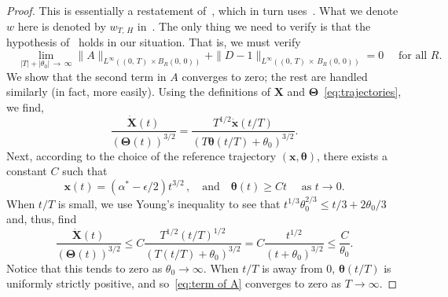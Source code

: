 \documentclass[10pt]{amsart}
\theoremstyle{definition}\newtheorem{defi}[theo]{Definition}\newtheorem{rema}[theo]{Remark}\newtheorem{exam}[theo]{Example}\newtheorem{exem}[theo]{Example}\newtheorem{nota}[theo]{Notation}
\newcommand{\bx}{\mathbf{x}}
\newcommand{\bX}{\mathbf{X}}
\newcommand{\btheta}{\boldsymbol{\theta}}
\newcommand{\bTheta}{\boldsymbol{\Theta}}
\newcommand{\1}{\mathds{1}}
\begin{document}
\begin{proof}
This is essentially a restatement of~\cite[p.~745]{BHR_acceleration}, which in turn uses~\cite[Lemmas~5.1, 5.2]{BHR_acceleration}. What we denote $w$ here is denoted by $w_{T,\,H}$ in~\cite{BHR_acceleration}. The only thing we need to verify is that the hypothesis of~\cite[Lemma~5.1]{BHR_acceleration} holds in our situation. That is, we must verify
\[
\quad \lim_{|T| + |\theta_0|\,\rightarrow\,\infty}\|A\|_{L^\infty\left((0,\,T)\,\times B_R(0,\,0)\right)}+\|D-1\|_{L^\infty\left((0,\,T)\,\times\,B_R(0,\,0)\right)} = 0 \quad \text{ for all }R.
\]
We show that the second term in $A$ converges to zero; the rest are handled similarly (in fact, more easily). Using the definitions of $\bX$ and $\bTheta$~\eqref{eq:trajectories}, we find,
\begin{equation}\label{eq:term of A}
\frac{\dot{\bX}(t)}{(\bTheta(t))^{3/2}} = \frac{T^{1/2}\dot{\bx}\left(t/T\right)}{\left(T\btheta\left(t/T\right) + \theta_0\right)^{3/2}}.
\end{equation}
Next, according to the choice of the reference trajectory $(\bx,\btheta)$, there exists a constant $C$ such that
\begin{equation}\label{eq:Theta near 0}
\bx(t) = (\alpha^* - \epsilon/2) t^{3/2}\,, \quad\text{and}\quad \btheta(t) \geq C t \quad \text{ as }t\to 0.
\end{equation}
When $t/T$ is small, we use Young's inequality to see that $t^{1/3} \theta_0^{2/3} \leq t/3 + 2 \theta_0/3$ and, thus, find
\[
\frac{\dot{\bX}(t)}{(\bTheta(t))^{3/2}} \leq C\frac{T^{1/2}\left(t/T\right)^{1/2}}{\left(T\left(t/T\right) + \theta_0\right)^{3/2}} = C\frac{t^{1/2}}{\left(t+\theta_0\right)^{3/2}} \leq \frac{C}{\theta_0}.
\]
Notice that this tends to zero as $\theta_0 \to \infty$. When $t/T$ is away from 0, $\btheta (t/T)$ is uniformly strictly positive, and so~\eqref{eq:term of A} converges to zero as $T\to \infty$.
\end{proof}
\end{document}
